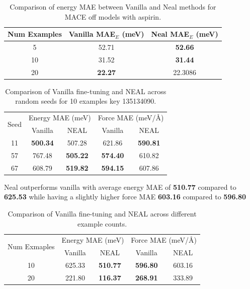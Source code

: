 \documentclass[12pt]{article}
\theoremstyle{definition}
\theoremstyle{remark}
\begin{document}
\begin{table}[h]
\centering
\begin{tabular}{c c c}
\hline
\textbf{Num Examples} & \textbf{Vanilla MAE$_E$ (meV)} & \textbf{Neal MAE$_E$ (meV)} \\
\hline
5  & 52.71 & \textbf{52.66} \\
10 & 31.52 & \textbf{31.44} \\
20 & \textbf{22.27} & 22.3086 \\
\hline
\end{tabular}
\caption{Comparison of energy MAE between Vanilla and Neal methods for MACE off models with aspirin.}
\label{tab:energy_comparison}
\end{table}
\newpage
\begin{table}[htbp]
\centering
\begin{tabular}{c|cc|cc}
\hline
\multirow{2}{*}{Seed} & \multicolumn{2}{c|}{Energy MAE (meV)} & \multicolumn{2}{c}{Force MAE (meV/\AA)} \\
 & Vanilla & NEAL & Vanilla & NEAL \\
\hline
11 & \textbf{500.34} & 507.28 & 621.86 & \textbf{590.81} \\
57 & 767.48 & \textbf{505.22} & \textbf{574.40} & 610.82 \\
67 & 608.79 & \textbf{519.82} & \textbf{594.15} & 607.86 \\
\hline
\end{tabular}
\caption{Comparison of Vanilla fine-tuning and NEAL across random seeds for 10 examples key 135134090.}
\end{table}

Neal outperforms vanilla with average energy MAE of \textbf{510.77} compared to \textbf{625.53} while having a slightly higher force MAE \textbf{603.16} compared to \textbf{596.80}

\begin{table}[htbp]
\centering
\begin{tabular}{c|cc|cc}
\hline
\multirow{2}{*}{Num Exmaples} & \multicolumn{2}{c|}{Energy MAE (meV)} & \multicolumn{2}{c}{Force MAE (meV/\AA)} \\
 & Vanilla & NEAL & Vanilla & NEAL \\
\hline
10 & 625.33 & \textbf{510.77} & \textbf{596.80} & 603.16 \\
20 & 221.80 & \textbf{116.37} & \textbf{268.91} & 333.89 \\
\hline
\end{tabular}
\caption{Comparison of Vanilla fine-tuning and NEAL across different example counts.}
\end{table}
\end{document}

